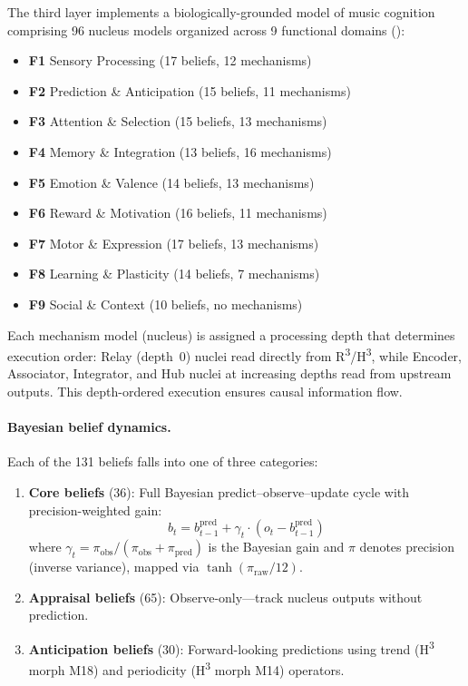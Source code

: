 \documentclass[twocolumn,10pt]{article}
\newcommand{\rthree}{R\textsuperscript{3}}
\newcommand{\hthree}{H\textsuperscript{3}}
\begin{document}
The third layer implements a biologically-grounded model of music cognition comprising 96 nucleus models organized across 9 functional domains ():

\begin{itemize}[nosep, leftmargin=*]
    \item \textbf{F1} Sensory Processing (17 beliefs, 12 mechanisms)
    \item \textbf{F2} Prediction \& Anticipation (15 beliefs, 11 mechanisms)
    \item \textbf{F3} Attention \& Selection (15 beliefs, 13 mechanisms)
    \item \textbf{F4} Memory \& Integration (13 beliefs, 16 mechanisms)
    \item \textbf{F5} Emotion \& Valence (14 beliefs, 13 mechanisms)
    \item \textbf{F6} Reward \& Motivation (16 beliefs, 11 mechanisms)
    \item \textbf{F7} Motor \& Expression (17 beliefs, 13 mechanisms)
    \item \textbf{F8} Learning \& Plasticity (14 beliefs, 7 mechanisms)
    \item \textbf{F9} Social \& Context (10 beliefs, no mechanisms)
\end{itemize}

Each mechanism model (nucleus) is assigned a processing depth that determines execution order: Relay (depth~0) nuclei read directly from \rthree{}/\hthree{}, while Encoder, Associator, Integrator, and Hub nuclei at increasing depths read from upstream outputs. This depth-ordered execution ensures causal information flow.

\paragraph{Bayesian belief dynamics.}
Each of the 131 beliefs falls into one of three categories:
\begin{enumerate}[nosep, leftmargin=*]
    \item \textbf{Core beliefs} (36): Full Bayesian predict--observe--update cycle with precision-weighted gain:
    \begin{equation}
    b_t = b_{t-1}^{\text{pred}} + \gamma_t \cdot (o_t - b_{t-1}^{\text{pred}})
    \label{eq:bayesian}
    \end{equation}
    where $\gamma_t = \pi_{\text{obs}} / (\pi_{\text{obs}} + \pi_{\text{pred}})$ is the Bayesian gain and $\pi$ denotes precision (inverse variance), mapped via $\tanh(\pi_{\text{raw}}/12)$.

    \item \textbf{Appraisal beliefs} (65): Observe-only---track nucleus outputs without prediction.

    \item \textbf{Anticipation beliefs} (30): Forward-looking predictions using trend (\hthree{} morph M18) and periodicity (\hthree{} morph M14) operators.
\end{enumerate}
\end{document}
